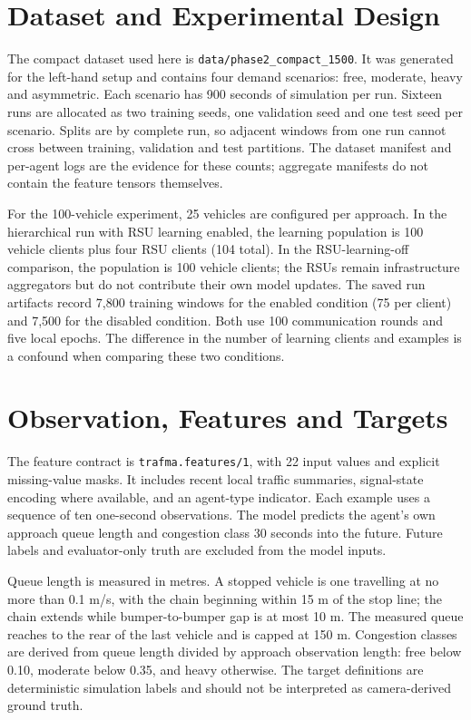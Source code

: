 \section{Dataset and Experimental Design}
The compact dataset used here is \texttt{data/phase2\_compact\_1500}. It was generated for the left-hand setup and contains four demand scenarios: free, moderate, heavy and asymmetric. Each scenario has 900 seconds of simulation per run. Sixteen runs are allocated as two training seeds, one validation seed and one test seed per scenario. Splits are by complete run, so adjacent windows from one run cannot cross between training, validation and test partitions. The dataset manifest and per-agent logs are the evidence for these counts; aggregate manifests do not contain the feature tensors themselves.

For the 100-vehicle experiment, 25 vehicles are configured per approach. In the hierarchical run with RSU learning enabled, the learning population is 100 vehicle clients plus four RSU clients (104 total). In the RSU-learning-off comparison, the population is 100 vehicle clients; the RSUs remain infrastructure aggregators but do not contribute their own model updates. The saved run artifacts record 7,800 training windows for the enabled condition (75 per client) and 7,500 for the disabled condition. Both use 100 communication rounds and five local epochs. The difference in the number of learning clients and examples is a confound when comparing these two conditions.

\section{Observation, Features and Targets}
The feature contract is \texttt{trafma.features/1}, with 22 input values and explicit missing-value masks. It includes recent local traffic summaries, signal-state encoding where available, and an agent-type indicator. Each example uses a sequence of ten one-second observations. The model predicts the agent's own approach queue length and congestion class 30 seconds into the future. Future labels and evaluator-only truth are excluded from the model inputs.

Queue length is measured in metres. A stopped vehicle is one travelling at no more than 0.1 m/s, with the chain beginning within 15 m of the stop line; the chain extends while bumper-to-bumper gap is at most 10 m. The measured queue reaches to the rear of the last vehicle and is capped at 150 m. Congestion classes are derived from queue length divided by approach observation length: free below 0.10, moderate below 0.35, and heavy otherwise. The target definitions are deterministic simulation labels and should not be interpreted as camera-derived ground truth.

